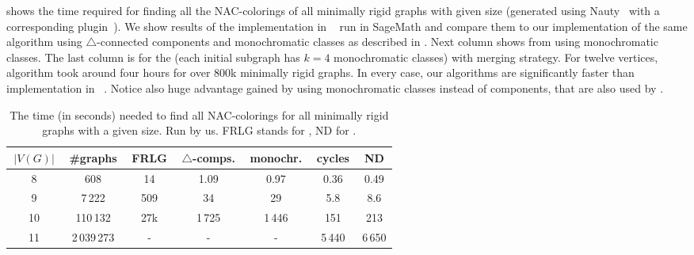 shows the time required for finding all the NAC-colorings
of all minimally rigid graphs with given size (generated using Nauty~\cite{nauty}
with a corresponding plugin~\cite{nauty_plugin}).
We show results of the implementation in \flexrilog{}~\cite{flexrilog} run in SageMath
and compare them to our implementation of the same \Naive{} algorithm
using $\triangle$-connected components
and monochromatic classes as described in .
Next column shows \NaiveCycles{} from 
using monochromatic classes.
The last column is for the \NeighborsDegree{} (each initial subgraph has $k=4$ monochromatic classes)
with \MergeLinear{} merging strategy.
For twelve vertices, \Neighbors{} algorithm took around four hours for over 800k minimally rigid graphs.
In every case, our algorithms are significantly faster than implementation in \flexrilog{}~\cite{flexrilog}.
Notice also huge advantage gained by using monochromatic classes instead of \trcon{} components,
that are also used by \flexrilog{}.
%
\begin{table}[ht]
	\caption[Running times on minimally rigid graphs.]{
		The time (in seconds) needed to find all NAC-colorings for all minimally rigid graphs with a given size. Run by us.
		\textsc{FRLG} stands for \flexrilog{}, \textsc{ND} for \NeighborsDegree{}.}%
	\label{tab:all_min_rigid}
	\vspace{0.3cm}
	\centering
	\begin{tabular}{ccccccc}
		\hline
		\,$|V(G)|$\, & \,\#graphs\, & \,FRLG\, & \,$\triangle$-comps.\, & \,monochr.\, & \,cycles\, & \,\textsc{ND}\, \\
		\hline
		8            & 608          & 14               & 1.09                   & 0.97         & 0.36       & 0.49                   \\
		9            & 7\,222       & 509              & 34                     & 29           & 5.8        & 8.6                    \\
		10           & 110\,132     & 27k              & 1\,725                 & 1\,446       & 151        & 213                    \\
		11           & 2\,039\,273  & -                & -                      & -            & 5\,440     & 6\,650                 \\
		\hline
	\end{tabular}
\end{table}

